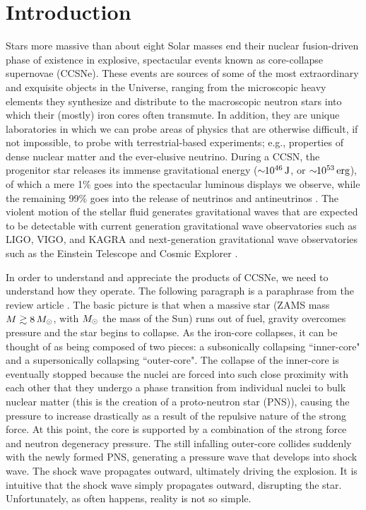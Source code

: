 \chapter{Introduction}

Stars more massive than about eight Solar masses end their nuclear
fusion-driven phase of existence in explosive, spectacular events
known as core-collapse supernovae (CCSNe).
These events are sources of some of the most extraordinary and
exquisite objects in the Universe, ranging from the microscopic heavy elements
they synthesize and distribute
to the macroscopic neutron stars into which their
(mostly) iron cores often transmute.
In addition, they are unique laboratories in which we can probe areas of
physics that are otherwise difficult, if not impossible, to probe with
terrestrial-based experiments; e.g., properties of dense nuclear matter and the
ever-elusive neutrino.
During a CCSN, the progenitor star releases its immense gravitational energy
($\sim\!\!10^{46}\,\mathrm{J}$, or $\sim\!\!10^{53}\,\mathrm{erg}$),
of which a mere 1\% goes into
the spectacular luminous displays we observe, while the remaining 99\% goes
into the release of neutrinos and antineutrinos \citep{bw2017}.
The violent motion of the stellar fluid generates gravitational waves that
are expected to be detectable with current generation gravitational wave
observatories such as LIGO, VIGO, and KAGRA \citep{aaa2020a,aaa2020b}
and next-generation gravitational wave observatories such as
the Einstein Telescope \citep{mvb2020} and Cosmic Explorer \citep{eaa2021}.

In order to understand and appreciate the products of CCSNe, we need to
understand how they operate.
The following paragraph is a paraphrase from the review article \citet{m2005}.
The basic picture is that when a massive star
(ZAMS mass $M\gtrsim8\,M_{\odot}$, with $M_{\odot}$ the mass of the Sun)
runs out of fuel, gravity overcomes pressure
and the star begins to collapse.
As the iron-core collapses, it can be thought of as being composed of
two pieces: a subsonically
collapsing ``inner-core" and a supersonically collapsing ``outer-core".
The collapse of the inner-core is eventually stopped because the nuclei are
forced into such close proximity with each other that they undergo a
phase transition from individual nuclei to bulk nuclear matter
(this is the creation of a proto-neutron star (PNS)),
causing the pressure to increase drastically as a result of the repulsive
nature of the strong force.
At this point, the core is supported by a combination of the strong force and
neutron degeneracy pressure.
The still infalling outer-core collides suddenly with the newly formed PNS,
generating a pressure wave that develops into shock wave.
The shock wave propagates outward, ultimately driving the explosion.
It is intuitive that the shock wave simply propagates outward, disrupting
the star.
Unfortunately, as often happens, reality is not so simple.

